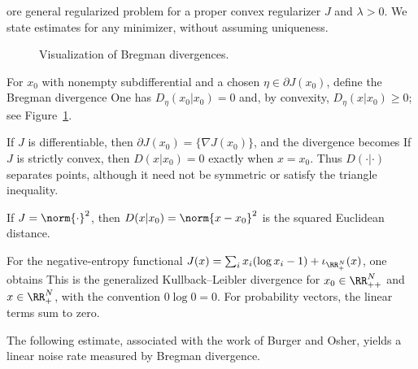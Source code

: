 ore general regularized problem
for a proper convex regularizer $J$ and $\lambda>0$. We state estimates for any minimizer, without assuming uniqueness.

\begin{figure}[tbp]
\centering
{}
\caption{Visualization of Bregman divergences.}
\label{fig-bregman}
\end{figure}

For $x_0$ with nonempty subdifferential and a chosen $\eta \in \partial J(x_0)$, define the Bregman divergence
One has $D_\eta(x_0|x_0)=0$ and, by convexity, $D_\eta(x|x_0)\geq0$; see Figure~\ref{fig-bregman}.

If $J$ is differentiable, then $\partial J(x_0)=\{\nabla J(x_0)\}$, and the divergence becomes
If $J$ is strictly convex, then $D(x|x_0)=0$ exactly when $x=x_0$. Thus $D(\cdot|\cdot)$ separates points, although it need not be symmetric or satisfy the triangle inequality.

If $J=\norm{\cdot}^2$, then $D(x|x_0) = \norm{x-x_0}^2$ is the squared Euclidean distance.
 
For the negative-entropy functional $J(x)=\sum_i x_i(\log x_i-1)+\iota_{\RR_+^N}(x)$, one obtains
This is the generalized Kullback--Leibler divergence for $x_0\in\RR_{++}^N$ and $x\in\RR_+^N$, with the convention $0\log0=0$. For probability vectors, the linear terms sum to zero.

The following estimate, associated with the work of Burger and Osher, yields a linear noise rate measured by Bregman divergence.


